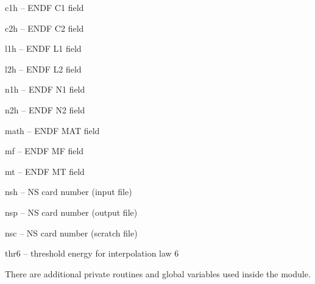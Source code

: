 \begin{description}
\begin{singlespace}
\item[c1h --] ENDF C1 field

\item[c2h --] ENDF C2 field

\item[l1h --] ENDF L1 field

\item[l2h --] ENDF L2 field

\item[n1h --] ENDF N1 field

\item[n2h --] ENDF N2 field

\item[math --] ENDF MAT field

\item[mf --] ENDF MF field

\item[mt --] ENDF MT field

\item[nsh --] NS card number (input file)

\item[nsp --] NS card number (output file)

\item[nsc --] NS card number (scratch file)

\item[thr6 --] threshold energy for interpolation law 6
\end{singlespace}
\end{description}

\noindent
There are additional private routines and global variables used
inside the module.

